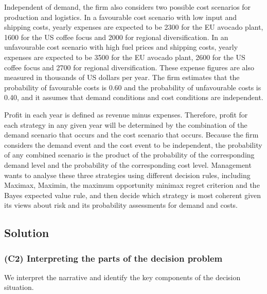 \documentclass[11pt]{article}
\begin{document}
	\medskip
	Independent of demand, the firm also considers two possible cost scenarios for production and logistics. In a
	favourable cost scenario with low input and shipping costs, yearly expenses are expected to be 2300 for the EU
	avocado plant, 1600 for the US coffee focus and 2000 for regional diversification. In an unfavourable cost
	scenario with high fuel prices and shipping costs, yearly expenses are expected to be 3500 for the EU avocado plant,
	2600 for the US coffee focus and 2700 for regional diversification. These expense figures are also measured in
	thousands of US dollars per year. The firm estimates that the probability of favourable costs is 0.60 and the
	probability of unfavourable costs is 0.40, and it assumes that demand conditions and cost conditions are independent.
	
	\medskip
	Profit in each year is defined as revenue minus expenses. Therefore, profit for each strategy in any given year will
	be determined by the combination of the demand scenario that occurs and the cost scenario that occurs. Because the
	firm considers the demand event and the cost event to be independent, the probability of any combined scenario is
	the product of the probability of the corresponding demand level and the probability of the corresponding cost
	level. Management wants to analyse these three strategies using different decision rules, including Maximax, Maximin,
	the maximum opportunity minimax regret criterion and the Bayes expected value rule, and then decide which strategy
	is most coherent given its views about risk and its probability assessments for demand and costs.
	
	\subsection{Solution}\label{subsec:example2-solution}
	
	\subsubsection{(C2) Interpreting the parts of the decision problem}\label{subsubsec:example2-c2}
	
	We interpret the narrative and identify the key components of the decision situation.
	
\end{document}
